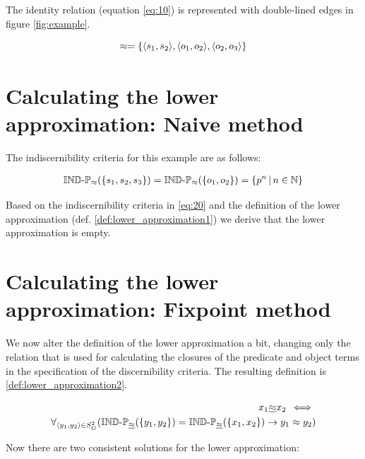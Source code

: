 \documentclass[a4paper]{article}
\begin{document}
The identity relation (equation \ref{eq:10}) is represented
  with double-lined edges in figure \ref{fig:example}.

\begin{equation}
\label{eq:10}
\approx = \{\langle s_1,s_2\rangle,\langle o_1,o_2\rangle,\langle o_2,o_3\rangle\}
\end{equation}



\section{Calculating the lower approximation: Naive method}
\label{sec:naive}

The indiscernibility criteria for this example are as follows:

\begin{align}
\label{eq:20}
  \operatorname{{\mathbb{IND}-\mathbb{P}}}_{\approx}(\{s_1,s_2,s_3\})
=
  \operatorname{{\mathbb{IND}-\mathbb{P}}}_{\approx}(\{o_1,o_2\})
=
  \{p^n\,\vert\,n \in \mathbb{N}\}
\end{align}

Based on the indiscernibility criteria in \ref{eq:20} and
  the definition of the lower approximation
  (def. \ref{def:lower_approximation1})
  we derive that the lower approximation is empty.



\section{Calculating the lower approximation: Fixpoint method}
\label{sec:fixpoint}

We now alter the definition of the lower approximation a bit,
  changing only the relation that is used for
  calculating the closures of the predicate and object terms
  in the specification of the discernibility criteria.
The resulting definition is \ref{def:lower_approximation2}.

\begin{definition}
\begin{align}
\label{def:lower_approximation2}
  x_1 \underline{\approx} x_2
\, \iff \,\\
  \forall_{\langle y_1,y_2\rangle \in S_G^2}(
        \operatorname{{\mathbb{IND}-\mathbb{P}}}_{\underline{\approx}}(\{y_1,y_2\})
      =
        \operatorname{{\mathbb{IND}-\mathbb{P}}}_{\underline{\approx}}(\{x_1,x_2\})
    \rightarrow
      y_1 \approx y_2
  )\nonumber
\end{align}
\end{definition}

Now there are two consistent solutions for the lower approximation:
\end{document}
